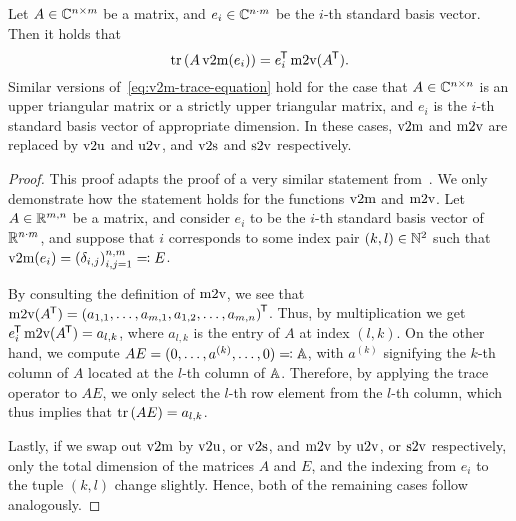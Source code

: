 \begin{lemma}\label{lem:v2m-function-trace}
    Let $A \in \mathbb{C}^{n \times m}$ be a matrix, and $e_i \in \mathbb{C}^{n \cdot m}$ be the $i$-th standard basis vector.
    Then it holds that
    \begin{equation}\label{eq:v2m-trace-equation}
        \mathop{}\!\mathrm{tr}\left(A \mathop{}\!\mathrm{v}2\mathrm{m}(e_i)\right) = e_i^{\mkern-1.5mu \mathsf{T}} \mathop{}\!\mathrm{m}2\mathrm{v}(A^{\mkern-1.5mu \mathsf{T}}).
    \end{equation}
    Similar versions of~\eqref{eq:v2m-trace-equation} hold for the case that $A \in \mathbb{C}^{n \times n}$ is an upper triangular matrix or a strictly upper triangular matrix, and $e_i$ is the $i$-th standard basis vector of appropriate dimension.
    In these cases, $\mathop{}\!\mathrm{v}2\mathrm{m}$ and $\mathop{}\!\mathrm{m}2\mathrm{v}$ are replaced by $\mathop{}\!\mathrm{v}2\mathrm{u}$ and $\mathop{}\!\mathrm{u}2\mathrm{v}$, and $\mathop{}\!\mathrm{v}2\mathrm{s}$ and $\mathop{}\!\mathrm{s}2\mathrm{v}$ respectively.
\end{lemma}

\begin{proof}
    This proof adapts the proof of a very similar statement from~\cite[Lemma~3.4]{Schwerdtner2023}.
    We only demonstrate how the statement holds for the functions $\mathop{}\!\mathrm{v}2\mathrm{m}$ and $\mathop{}\!\mathrm{m}2\mathrm{v}$.
    Let $A \in \mathbb{R}^{m, n}$ be a matrix, and consider $e_i$ to be the $i$-th standard basis vector of $\mathbb{R}^{n \cdot m}$, and suppose that $i$ corresponds to some index pair $(k, l) \in \mathbb{N}^2$ such that $\mathop{}\!\mathrm{v}2\mathrm{m}(e_i) = {(\delta_{i, j})}_{i, j = 1}^{n, m} \eqqcolon E$.


    By consulting the definition of $\mathop{}\!\mathrm{m}2\mathrm{v}$, we see that $\mathop{}\!\mathrm{m}2\mathrm{v}(A^{\mkern-1.5mu \mathsf{T}}) = {(a_{1, 1}, \dots, a_{m, 1}, a_{1, 2}, \dots, a_{m, n})}^{\mkern-1.5mu \mathsf{T}}$.
    Thus, by multiplication we get $e_i^{\mkern-1.5mu \mathsf{T}} \mathop{}\!\mathrm{m}2\mathrm{v}(A^{\mkern-1.5mu \mathsf{T}}) = a_{l, k}$, where $a_{l, k}$ is the entry of $A$ at index $(l, k)$.
    On the other hand, we compute $A E = (0, \dots, a^{(k)}, \dots, 0) \eqqcolon \mathbb{A}$, with $a^{(k)}$ signifying the $k$-th column of $A$ located at the $l$-th column of $\mathbb{A}$.
    Therefore, by applying the trace operator to $A E$, we only select the $l$-th row element from the $l$-th column, which thus implies that $\mathop{}\!\mathrm{tr}\left(A E\right) = a_{l, k}$.

    Lastly, if we swap out $\mathop{}\!\mathrm{v}2\mathrm{m}$ by $\mathop{}\!\mathrm{v}2\mathrm{u}$, or $\mathop{}\!\mathrm{v}2\mathrm{s}$, and $\mathop{}\!\mathrm{m}2\mathrm{v}$ by $\mathop{}\!\mathrm{u}2\mathrm{v}$, or $\mathop{}\!\mathrm{s}2\mathrm{v}$ respectively, only the total dimension of the matrices $A$ and $E$, and the indexing from $e_i$ to the tuple $(k, l)$ change slightly.
    Hence, both of the remaining cases follow analogously.
\end{proof}


